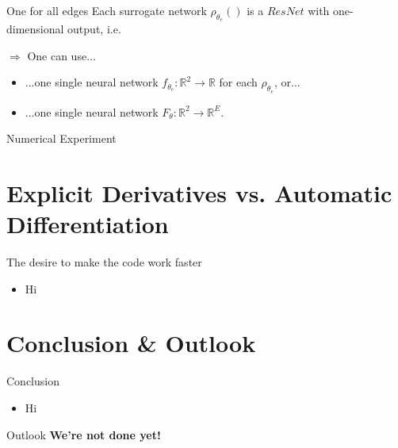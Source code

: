 \documentclass[9pt]{beamer}
\begin{document}
\begin{frame}{One for all edges}
    Each surrogate network $\rho_{\theta_e}()$ is a $ResNet$ with one-dimensional output, i.e.  
    
    \vspace{3mm}

    $\Rightarrow$ One can use$\ldots$
    \begin{itemize}
        \item $\ldots$one single neural network $f_{\theta_e} \colon \mathbb{R}^2 \to \mathbb{R}$ for each $\rho_{\theta_e}$, or$\ldots$
        \item $\ldots$one single neural network $F_{\theta} \colon \mathbb{R}^2 \to \mathbb{R}^E$.
    \end{itemize}
\end{frame}


\begin{frame}{Numerical Experiment}
    
\end{frame}



\section{Explicit Derivatives vs. Automatic Differentiation}



\begin{frame}{The desire to make the code work faster}
    \begin{itemize}
        \item Hi
    \end{itemize}
\end{frame}



\section{Conclusion \& Outlook}



\begin{frame}{Conclusion}
    \begin{itemize}
        \item Hi
    \end{itemize}
\end{frame}



\begin{frame}{Outlook}
    \textbf{We're not done yet!}
\end{frame}
\end{document}
